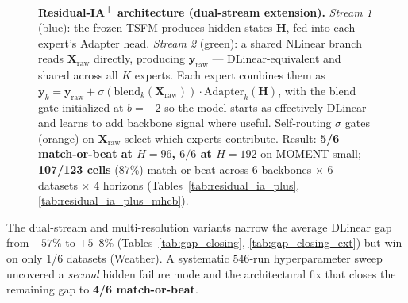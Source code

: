 \documentclass{article}
\begin{document}
\begin{figure}[!htbp]
{%
}%
\caption{\textbf{Residual-IA\textsuperscript{+} architecture (dual-stream extension).} \textit{Stream 1} (blue): the frozen TSFM produces hidden states $\mathbf{H}$, fed into each expert's Adapter head. \textit{Stream 2} (green): a shared NLinear branch reads $\mathbf{X}_\mathrm{raw}$ directly, producing $\mathbf{y}_\mathrm{raw}$ — DLinear-equivalent and shared across all $K$ experts. Each expert combines them as $\mathbf{y}_k = \mathbf{y}_\mathrm{raw} + \sigma(\mathrm{blend}_k(\mathbf{X}_\mathrm{raw})) \cdot \mathrm{Adapter}_k(\mathbf{H})$, with the blend gate initialized at $b{=}{-}2$ so the model starts as effectively-DLinear and learns to add backbone signal where useful. Self-routing $\sigma$ gates (orange) on $\mathbf{X}_\mathrm{raw}$ select which experts contribute. Result: \textbf{5/6 match-or-beat at $H{=}96$, $6/6$ at $H{=}192$} on MOMENT-small; \textbf{107/123 cells} ($87\%$) match-or-beat across 6 backbones $\times$ 6 datasets $\times$ 4 horizons (Tables~\ref{tab:residual_ia_plus}, \ref{tab:residual_ia_plus_mhcb}).}
\label{fig:residual_ia_arch}
\end{figure}

The dual-stream and multi-resolution variants narrow the average DLinear gap from $+57\%$ to $+5$--$8\%$ (Tables~\ref{tab:gap_closing}, \ref{tab:gap_closing_ext}) but win on only 1/6 datasets (Weather). A systematic $546$-run hyperparameter sweep uncovered a \emph{second} hidden failure mode and the architectural fix that closes the remaining gap to \textbf{4/6 match-or-beat}.
\end{document}
